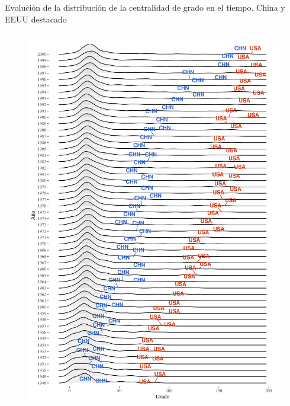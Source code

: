 \documentclass[compress]{beamer}
\begin{document}
\begin{frame}	
\small{Evolución de la distribución de la centralidad de grado en el tiempo. China y EEUU destacado}

\begin{columns}[c] 
	
	
	\begin{figure}
		\includegraphics[scale=0.25]{1950_2000_impo_densidad_USA_CHN_grado}
	\end{figure}
	
	

\end{columns}
\end{frame}
\end{document}
